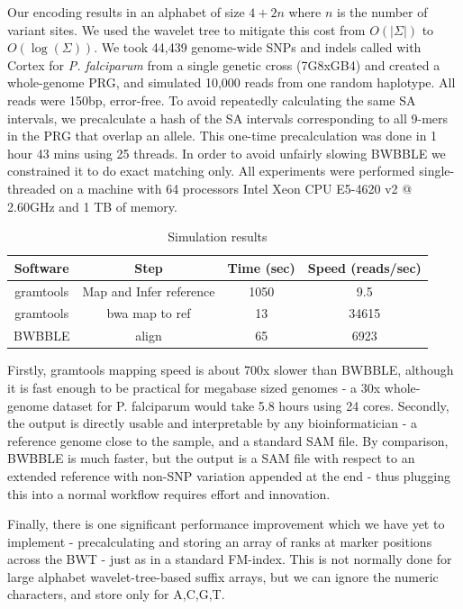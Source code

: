 \documentclass[runningheads,a4paper]{llncs}
\begin{document}
Our encoding results in an alphabet of size $4+2n$ where $n$ is the number of variant sites. We used the wavelet tree to mitigate this cost from $O(|\Sigma|)$ to $O(\log(\Sigma))$.
We  took 44,439 genome-wide SNPs and indels called with Cortex for \textit{P. falciparum} from a single genetic cross (7G8xGB4) \cite{miles} and created a whole-genome PRG, and simulated 10,000 reads from one random haplotype. All reads were 150bp, error-free. To avoid repeatedly calculating the same SA intervals, we precalculate a hash of the SA intervals corresponding to all 9-mers in the PRG that overlap an allele. This one-time precalculation was done in 1 hour 43 mins using 25 threads. In order to avoid unfairly slowing BWBBLE we constrained it to do exact matching only.  All experiments were performed single-threaded on a machine with 64 processors Intel Xeon CPU E5-4620 v2 @ 2.60GHz and 1 TB of memory.

\begin{table}
\caption{Simulation results }
\centering
\begin{tabular}{c c c c}
\hline
Software  & Step & Time (sec) & Speed (reads/sec)\\
\hline
gramtools & Map and Infer reference &  1050 & 9.5 \\
gramtools & bwa map to ref & 13  & 34615 \\
BWBBLE  & align & 65 & 6923 \\ 
\hline
\end{tabular}
\end{table}

Firstly, gramtools mapping speed is about 700x slower than BWBBLE, although it is fast enough to be practical for megabase sized genomes - a 30x whole-genome dataset for P. falciparum would take 5.8 hours using 24 cores. Secondly, the output is directly usable and interpretable by any bioinformatician - a reference genome close to the sample, and a standard SAM file. By comparison, BWBBLE is much faster, but the output is a SAM file with respect to an extended reference with non-SNP variation appended at the end - thus plugging this into a normal workflow requires effort and innovation.

Finally, there is one significant performance improvement which we have yet to implement - precalculating and storing an array of ranks at marker positions across the BWT - just as in a standard FM-index. This is not normally done for large alphabet wavelet-tree-based suffix arrays, but we can ignore the numeric characters, and store only for A,C,G,T. 
\end{document}

